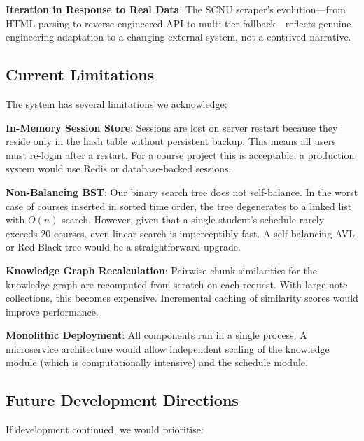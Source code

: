 \documentclass[11pt,a4paper]{article}
\begin{document}
\textbf{Iteration in Response to Real Data}: The SCNU scraper's evolution---from HTML parsing to reverse-engineered API to multi-tier fallback---reflects genuine engineering adaptation to a changing external system, not a contrived narrative.

\subsection{Current Limitations}
The system has several limitations we acknowledge:

\textbf{In-Memory Session Store}: Sessions are lost on server restart because they reside only in the hash table without persistent backup. This means all users must re-login after a restart. For a course project this is acceptable; a production system would use Redis or database-backed sessions.

\textbf{Non-Balancing BST}: Our binary search tree does not self-balance. In the worst case of courses inserted in sorted time order, the tree degenerates to a linked list with $O(n)$ search. However, given that a single student's schedule rarely exceeds 20 courses, even linear search is imperceptibly fast. A self-balancing AVL or Red-Black tree would be a straightforward upgrade.

\textbf{Knowledge Graph Recalculation}: Pairwise chunk similarities for the knowledge graph are recomputed from scratch on each request. With large note collections, this becomes expensive. Incremental caching of similarity scores would improve performance.

\textbf{Monolithic Deployment}: All components run in a single process. A microservice architecture would allow independent scaling of the knowledge module (which is computationally intensive) and the schedule module.

\subsection{Future Development Directions}
If development continued, we would prioritise:
\end{document}
